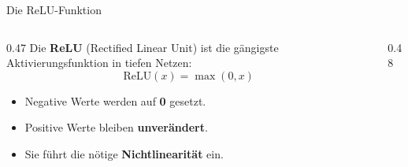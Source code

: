 \begin{frame}{Die ReLU-Funktion}
\footnotesize
\begin{columns}
\begin{column}{0.47\textwidth}
Die \textbf{ReLU} (Rectified Linear Unit) ist die gängigste Aktivierungsfunktion in tiefen Netzen:
\[
\text{ReLU}(x) = \max(0, x)
\]
\begin{itemize}
\item Negative Werte werden auf \textbf{0} gesetzt.
\item Positive Werte bleiben \textbf{unverändert}.
\item Sie führt die nötige \textbf{Nichtlinearität} ein.
\end{itemize}
\end{column}
\begin{column}{0.48\textwidth}
\end{column}
\end{columns}
\end{frame}

